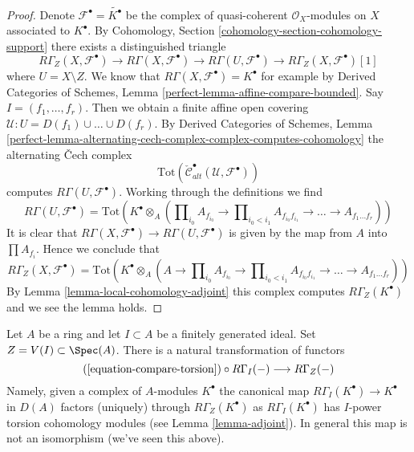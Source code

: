 \begin{proof}
Denote $\mathcal{F}^\bullet = \widetilde{K^\bullet}$ be
the complex of quasi-coherent $\mathcal{O}_X$-modules on $X$
associated to $K^\bullet$.
By Cohomology, Section \ref{cohomology-section-cohomology-support}
there exists a distinguished triangle
$$
R\Gamma_Z(X, \mathcal{F}^\bullet)
\to R\Gamma(X, \mathcal{F}^\bullet)
\to R\Gamma(U, \mathcal{F}^\bullet)
\to R\Gamma_Z(X, \mathcal{F}^\bullet)[1]
$$
where $U = X \setminus Z$. We know that
$R\Gamma(X, \mathcal{F}^\bullet) = K^\bullet$
for example by Derived Categories of Schemes, Lemma
\ref{perfect-lemma-affine-compare-bounded}.
Say $I = (f_1, \ldots, f_r)$. Then we obtain a finite affine
open covering $\mathcal{U} : U = D(f_1) \cup \ldots \cup D(f_r)$.
By Derived Categories of Schemes, Lemma
\ref{perfect-lemma-alternating-cech-complex-complex-computes-cohomology}
the alternating {\v C}ech complex
$$
\text{Tot}(\check{\mathcal{C}}_{alt}^\bullet(\mathcal{U}, \mathcal{F}^\bullet))
$$
computes $R\Gamma(U, \mathcal{F}^\bullet)$. Working through the
definitions we find
$$
R\Gamma(U, \mathcal{F}^\bullet) =
\text{Tot}\left(
K^\bullet \otimes_A
(\prod\nolimits_{i_0} A_{f_{i_0}} \to
\prod\nolimits_{i_0 < i_1} A_{f_{i_0}f_{i_1}} \to
\ldots \to A_{f_1\ldots f_r})\right)
$$
It is clear that
$R\Gamma(X, \mathcal{F}^\bullet) \to R\Gamma(U, \mathcal{F}^\bullet)$
is given by the map from $A$ into $\prod A_{f_i}$. Hence we conclude that
$$
R\Gamma_Z(X, \mathcal{F}^\bullet) =
\text{Tot}\left(
K^\bullet \otimes_A
(A \to \prod\nolimits_{i_0} A_{f_{i_0}} \to
\prod\nolimits_{i_0 < i_1} A_{f_{i_0}f_{i_1}} \to
\ldots \to A_{f_1\ldots f_r})\right)
$$
By Lemma \ref{lemma-local-cohomology-adjoint}
this complex computes $R\Gamma_Z(K^\bullet)$ and we see the lemma holds.
\end{proof}

\noindent
Let $A$ be a ring and let $I \subset A$ be a finitely generated ideal.
Set $Z = V(I) \subset \Spec(A)$. There is a natural transformation of
functors
\begin{equation}
\label{equation-compare-torsion-functors}
(\ref{equation-compare-torsion}) \circ R\Gamma_I(-)
\longrightarrow
R\Gamma_Z(-)
\end{equation}
Namely, given a complex of $A$-modules $K^\bullet$ the canonical map
$R\Gamma_I(K^\bullet) \to K^\bullet$ in $D(A)$ factors (uniquely)
through $R\Gamma_Z(K^\bullet)$ as $R\Gamma_I(K^\bullet)$ has
$I$-power torsion cohomology modules (see Lemma \ref{lemma-adjoint}).
In general this map is not an isomorphism (we've seen this above).

